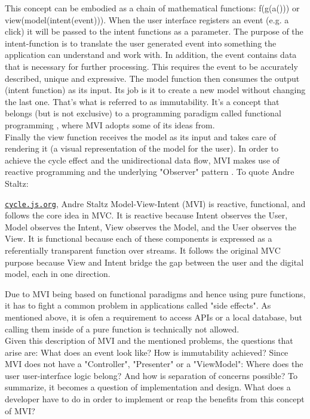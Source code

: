 This concept can be embodied as a chain of mathematical functions: f(g(a())) or view(model(intent(event))).
When the user interface registers an event (e.g. a click) it will be passed to the intent functions as a parameter. 
The purpose of the intent-function is to translate the user generated event into something the application can understand and work with.
In addition, the event contains data that is necessary for further processing. This requires the event to be accurately described, unique and expressive.
The model function then consumes the output (intent function) as its input. Its job is it to create a new model without changing the last one. 
That's what is referred to as immutability. 
\cite{immutabilityEffectiveJavaJoshuaBloch2017,immutabilityImmutableObjectsInJavaChristianHaack2006}
It's a concept that belongs (but is not exclusive) to a programming paradigm called functional programming
\cite{functionalProgrammingFunctionalProgrammingInJavaPierreYves2017},
where MVI adopts some of its ideas from.
\\
Finally the view function receives the model as its input and takes care of rendering it (a visual representation of the model for the user). 
In order to achieve the cycle effect and the unidirectional data flow, MVI makes use of reactive programming 
\cite{reactiveProgrammingReactiveProgrammingWithJavaBenChristensen,reactiveProgrammingTheIntroductionToReactiveAndreStaltz} 
and the underlying "Observer" pattern 
\cite{wikipediaObserverPattern}.
To quote Andre Staltz:
\begin{pquotation}{\href{https://cycle.js.org/model-view-intent.html#model-view-intent-what-mvc-is-really-about}{\nolinkurl{cycle.js.org}}, Andre Staltz}
    Model-View-Intent (MVI) is reactive, functional, and follows the core idea in MVC. It is reactive because Intent observes the User, Model observes the Intent, 
    View observes the Model, and the User observes the View. It is functional because each of these components is expressed as a referentially transparent function 
    over streams. It follows the original MVC purpose because View and Intent bridge the gap between the user and the digital model, each in one direction.
\end{pquotation}
Due to MVI being based on functional paradigms and hence using pure functions, it has to fight a common problem in applications called "side effects".
As mentioned above, it is ofen a requirement to access APIs or a local database, but calling them inside of a pure function is technically not allowed.
\\
Given this description of MVI and the mentioned problems, the questions that arise are: What does an event look like? How is immutability achieved?
Since MVI does not have a "Controller", "Presenter" or a "ViewModel": Where does the user user-interface logic belong? And how is separation of concerns possible?
To summarize, it becomes a question of implementation and design. What does a developer have to do in order to implement or reap the benefits from this concept of MVI?